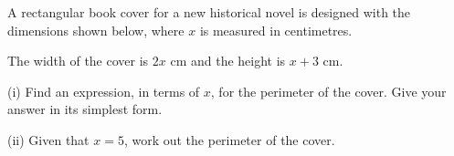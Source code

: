 \begin{question}
\noindent A rectangular book cover for a new historical novel is designed with the dimensions shown below, where $x$ is measured in centimetres.

\begin{center}
\end{center}

\noindent The width of the cover is $2x$ cm and the height is $x + 3$ cm.

\vspace{0.3cm}
\noindent (i) Find an expression, in terms of $x$, for the perimeter of the cover. Give your answer in its simplest form.

\vspace{0.3cm}
\noindent (ii) Given that $x = 5$, work out the perimeter of the cover.

\vspace{4cm}
\begin{flushright}
\end{flushright}
\end{question}
